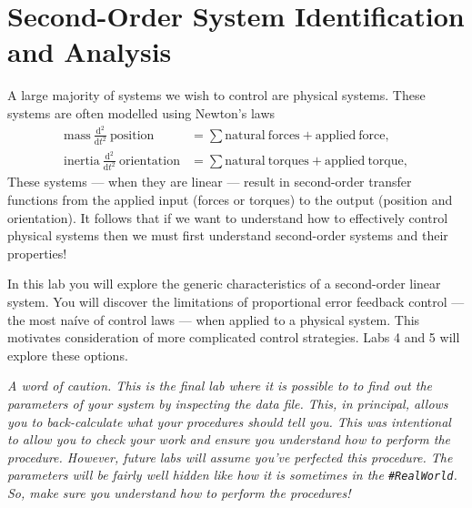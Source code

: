 \chapter{Second-Order System Identification and Analysis}\label{Lab:2}
A large majority of systems we wish to control are physical systems. These
systems are often modelled using Newton's laws
\[
\begin{aligned}
  \mathrm{mass}~\frac{\mathrm d^2}{\mathrm{d}t^2}~\mathrm{position}
    &= \sum \mathrm{natural~forces} + \mathrm{applied~force},\\
  \mathrm{inertia}~\frac{\mathrm d^2}{\mathrm{d}t^2}~\mathrm{orientation}
    &= \sum \mathrm{natural~torques} + \mathrm{applied~torque},
\end{aligned}
\]
These systems --- when
they are linear --- result in second-order transfer functions from the
applied input (forces or torques) to the output (position and orientation).
It follows that if we want to understand how to effectively control physical
systems then we must first understand second-order systems and their
properties!

In this lab you will explore the generic characteristics of a second-order
linear system. You will discover the limitations of proportional error
feedback control --- the most na\'ive of control laws --- when applied to
a physical system. This motivates consideration of
more complicated control strategies. Labs 4 and 5 will explore these options.

\emph{A word of caution. This is the final lab where it is possible to
to find out the parameters of your system by inspecting the data file.
This, in principal, allows you to back-calculate what your procedures should
tell you. This was intentional to allow
you to check your work and ensure you understand how to perform the procedure.
However, future labs will assume you've perfected this procedure.
The parameters will be fairly well hidden like how it is sometimes in the
\texttt{\#RealWorld}. So, make sure you understand how to perform the
procedures!}

